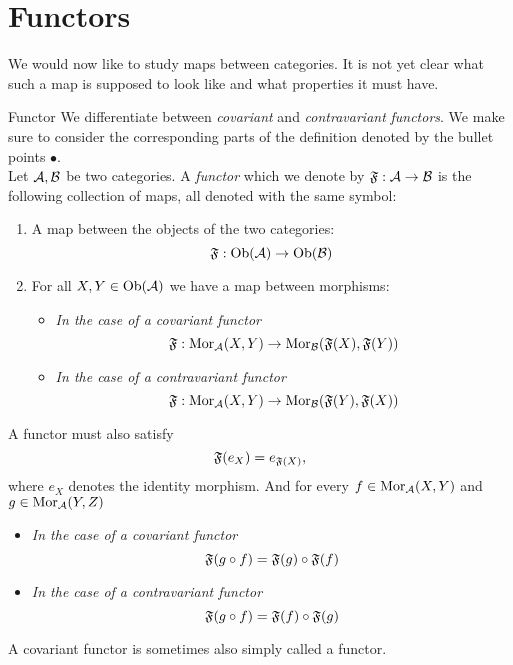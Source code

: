 \section{Functors}
We would now like to study maps between categories. It is not yet clear what such a map is supposed to look like and what properties it must have.

\begin{definition}{Functor \cite[Section~1.3]{Roman2017}}{}
We differentiate between \emph{covariant} and \emph{contravariant} \emph{functors}. 
We make sure to consider the corresponding parts of the definition denoted by the bullet points $\bullet$.\\

Let $\mathcal{A}, \mathcal{B}$ be two categories. A \emph{functor} which we denote by $\mathfrak{F}: \mathcal{A} \to \mathcal{B}$ is the following collection of maps, all denoted with the same symbol:
\begin{enumerate}
    \item A map between the objects of the two categories:
    $$
    \mathfrak{F}: \mathrm {Ob}(\mathcal{A}) \to \mathrm {Ob}(\mathcal{B})
    $$
    \item For all $X,Y \in \mathrm {Ob}(\mathcal{A})$ we have a map between morphisms: 
    \begin{itemize}
        \item \emph{In the case of a covariant functor} $$\mathfrak{F}: \mathrm {Mor}_{\mathcal{A}}(X,Y) \to \mathrm {Mor}_{\mathcal{B}}(\mathfrak{F}(X), \mathfrak{F}(Y))$$
        \item \emph{In the case of a contravariant functor} $$\mathfrak{F}: \mathrm {Mor}_{\mathcal{A}}(X,Y) \to \mathrm {Mor}_{\mathcal{B}}(\mathfrak{F}(Y), \mathfrak{F}(X))$$
    \end{itemize}
\end{enumerate}
A functor must also satisfy
\begin{equation}
\label{eq:functor_functoriality_identity}
\mathfrak{F}(e_X) = e_{\mathfrak{F}(X)},
\end{equation}
where $e_X$ denotes the identity morphism. And for every $f \in \mathrm {Mor}_{\mathcal{A}}(X,Y)$ and $g \in \mathrm {Mor}_{\mathcal{A}}(Y,Z)$
\begin{itemize}
    \item \emph{In the case of a covariant functor}
    \begin{equation}
    \label{eq:functor_functoriality_covar}
    \mathfrak{F}(g \circ f) = \mathfrak{F}(g) \circ \mathfrak{F}(f)
    \end{equation}
    
    \item \emph{In the case of a contravariant functor}
    \begin{equation}
    \label{eq:functor_functoriality_contravar}
    \mathfrak{F}(g \circ f) = \mathfrak{F}(f) \circ \mathfrak{F}(g)
    \end{equation}
\end{itemize}
A covariant functor is sometimes also simply called a functor.
\end{definition}


